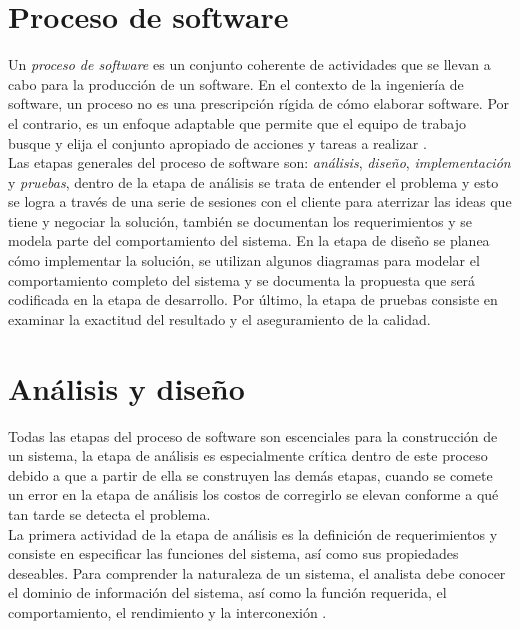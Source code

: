 \section{Proceso de software}
Un \emph{proceso de software} es un conjunto coherente de actividades que se llevan a cabo para la producción de un software. 
En el contexto de la ingeniería de software, un proceso no es una prescripción rígida de cómo
elaborar software. Por el contrario, es un enfoque adaptable que permite que
el equipo de trabajo busque y elija el conjunto apropiado de
acciones y tareas a realizar \cite{sommerville1992software}.\\

Las etapas generales del proceso de software son: \emph{análisis}, \emph{diseño}, \emph{implementación} y \emph{pruebas},  
dentro de la etapa de análisis se trata de entender el problema y esto se logra a través de una serie de sesiones con el cliente 
para aterrizar las ideas que tiene y negociar la solución, también se documentan los requerimientos y se modela parte del comportamiento del sistema. En la etapa de 
diseño se planea cómo implementar la solución, se utilizan algunos diagramas para modelar el comportamiento completo del sistema y se documenta la propuesta que será
codificada en la etapa de desarrollo. 
Por último, la etapa de pruebas consiste en examinar la exactitud del resultado y el aseguramiento de la calidad.\\

\section{Análisis y diseño}
Todas las etapas del proceso de software son escenciales para la construcción de un sistema, la etapa de análisis es especialmente crítica dentro de este proceso 
debido a que a partir de ella se construyen las demás etapas, cuando se comete un error en la etapa de análisis los costos de 
corregirlo se elevan conforme a qué tan tarde se detecta el problema.\\

La primera actividad de la etapa de análisis es la definición de requerimientos y consiste en especificar las funciones del sistema, así como sus propiedades 
deseables.  Para comprender la naturaleza de un sistema, 
el analista debe conocer el dominio de información del sistema, así como la función requerida, el comportamiento, el rendimiento y la interconexión \cite{pressman2005software}.\\

